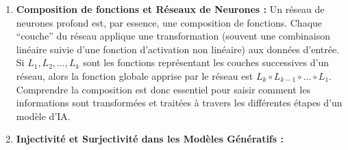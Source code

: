 \documentclass[12pt,a4paper]{report}
\begin{document}
\begin{enumerate}
\def\labelenumi{\arabic{enumi}.}
\item
  \textbf{Composition de fonctions et Réseaux de Neurones :} Un réseau
  de neurones profond est, par essence, une composition de fonctions.
  Chaque ``couche'' du réseau applique une transformation (souvent une
  combinaison linéaire suivie d'une fonction d'activation non linéaire)
  aux données d'entrée. Si \(L_1, L_2, \dots, L_k\) sont les fonctions
  représentant les couches successives d'un réseau, alors la fonction
  globale apprise par le réseau est
  \(L_k \circ L_{k-1} \circ \dots \circ L_1\). Comprendre la composition
  est donc essentiel pour saisir comment les informations sont
  transformées et traitées à travers les différentes étapes d'un modèle
  d'IA.
\item
  \textbf{Injectivité et Surjectivité dans les Modèles Génératifs :}


\end{enumerate}
\end{document}
